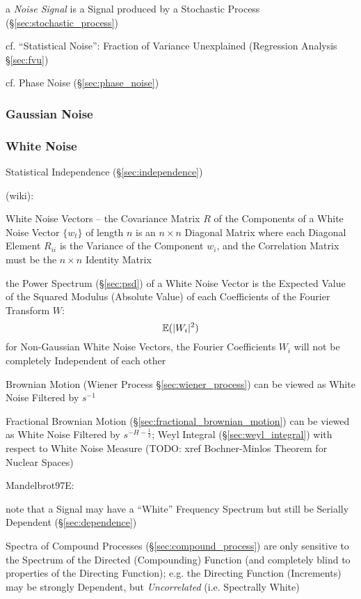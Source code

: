 a \emph{Noise Signal} is a Signal produced by a Stochastic Process
(\S\ref{sec:stochastic_process})

cf. ``Statistical Noise'': Fraction of Variance Unexplained (Regression Analysis
\S\ref{sec:fvu})

cf. Phase Noise (\S\ref{sec:phase_noise})



\subsubsection{Gaussian Noise}\label{sec:gaussian_noise}

\subsubsection{White Noise}\label{sec:white_noise}

Statistical Independence (\S\ref{sec:independence})

(wiki):

White Noise Vectors -- the Covariance Matrix $R$ of the Components of a White
Noise Vector $\{ w_t \}$ of length $n$ is an $n \times n$ Diagonal Matrix where
each Diagonal Element $R_{ii}$ is the Variance of the Component $w_i$, and the
Correlation Matrix must be the $n \times n $ Identity Matrix

the Power Spectrum (\S\ref{sec:psd}) of a White Noise Vector is the Expected
Value of the Squared Modulus (Absolute Value) of each Coefficients of the
Fourier Transform $W$:
\[
  \mathbb{E}(|W_i|^2)
\]
for Non-Gaussian White Noise Vectors, the Fourier Coefficients $W_i$ will not be
completely Independent of each other

Brownian Motion (Wiener Process \S\ref{sec:wiener_process}) can be viewed as
White Noise Filtered by $s^{-1}$

Fractional Brownian Motion (\S\ref{sec:fractional_brownian_motion}) can be
viewed as White Noise Filtered by $s^{-H-\frac{1}{2}}$;
Weyl Integral (\S\ref{sec:weyl_integral}) with respect to White Noise Measure
(TODO: xref Bochner-Minlos Theorem for Nuclear Spaces)

Mandelbrot97E:

note that a Signal may have a ``White'' Frequency Spectrum but still be Serially
Dependent (\S\ref{sec:dependence})

Spectra of Compound Processes (\S\ref{sec:compound_process}) are only sensitive
to the Spectrum of the Directed (Compounding) Function (and completely blind to
properties of the Directing Function); e.g. the Directing Function (Increments)
may be strongly Dependent, but \emph{Uncorrelated} (i.e. Spectrally White)

